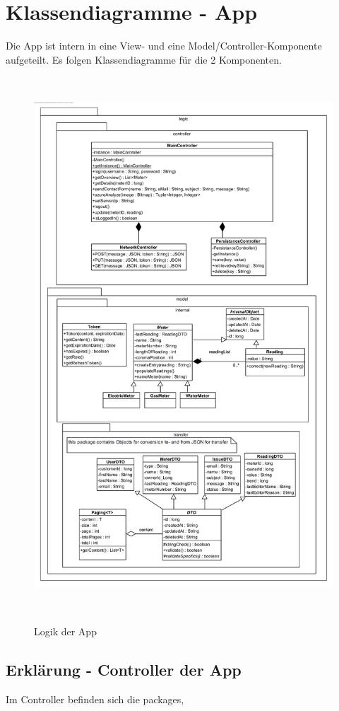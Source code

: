 \section{Klassendiagramme - App}
Die App ist intern in eine View- und eine Model/Controller-Komponente aufgeteilt. Es folgen Klassendiagramme für die 2 Komponenten.
\begin{figure}[H]
\centering
\includegraphics[height=20cm,width=15cm]{img/diagrams/Android-Class-Diagram-Logic}\\
\caption{Logik der App}
\end{figure}


\subsection*{Erklärung - Controller der App}
Im Controller befinden sich die packages,

